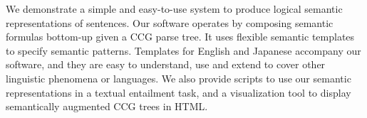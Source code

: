 We demonstrate a simple and easy-to-use system to produce logical semantic representations of sentences. Our software operates by composing semantic formulas bottom-up given a CCG parse tree. It uses flexible semantic templates to specify semantic patterns. Templates for English and Japanese accompany our software, and they are easy to understand, use and extend to cover other linguistic phenomena or languages.  We also provide scripts to use our semantic representations in a textual entailment task, and a visualization tool to display semantically augmented CCG trees in HTML.
